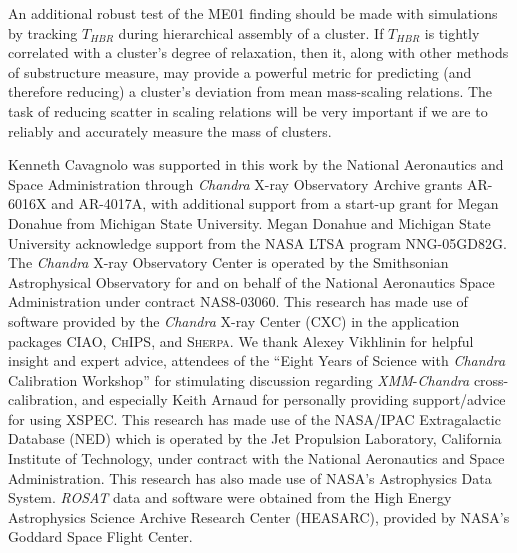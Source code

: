 \documentclass[12pt,preprint]{aastex}
\begin{document}
An additional robust test of the ME01 finding should be made with
simulations by tracking $T_{HBR}$ during hierarchical assembly of a
cluster. If $T_{HBR}$ is tightly correlated with a cluster's degree of
relaxation, then it, along with other methods of substructure measure,
may provide a powerful metric for predicting (and therefore reducing)
a cluster's deviation from mean mass-scaling relations. The
task of reducing scatter in scaling relations will be very important
if we are to reliably and accurately measure the mass of clusters.

\acknowledgements
Kenneth Cavagnolo was supported in this work by the National
Aeronautics and Space Administration through {\it Chandra} X-ray
Observatory Archive grants AR-6016X and AR-4017A, with additional
support from a start-up grant for Megan Donahue from Michigan State
University. Megan Donahue and Michigan State University acknowledge
support from the NASA LTSA program NNG-05GD82G. The {\it Chandra}
X-ray Observatory Center is operated by the Smithsonian Astrophysical
Observatory for and on behalf of the National Aeronautics Space
Administration under contract NAS8-03060. This research has made use
of software provided by the {\it Chandra} X-ray Center (CXC) in the
application packages {\textsc{CIAO}}, {\textsc{ChIPS}}, and
{\textsc{Sherpa}}. We thank Alexey Vikhlinin for helpful insight and
expert advice, attendees of the ``Eight Years of Science with {\it Chandra}
Calibration Workshop'' for stimulating discussion regarding {\it
XMM}-{\it Chandra} cross-calibration, and especially Keith Arnaud for
personally providing support/advice for using {\textsc{XSPEC}}. This
research has made use of the NASA/IPAC Extragalactic Database (NED)
which is operated by the Jet Propulsion Laboratory, California
Institute of Technology, under contract with the National Aeronautics
and Space Administration. This research has also made use of NASA's
Astrophysics Data System. {\it ROSAT} data and software were obtained
from the High Energy Astrophysics Science Archive Research Center
(HEASARC), provided by NASA's Goddard Space Flight Center.
\end{document}
